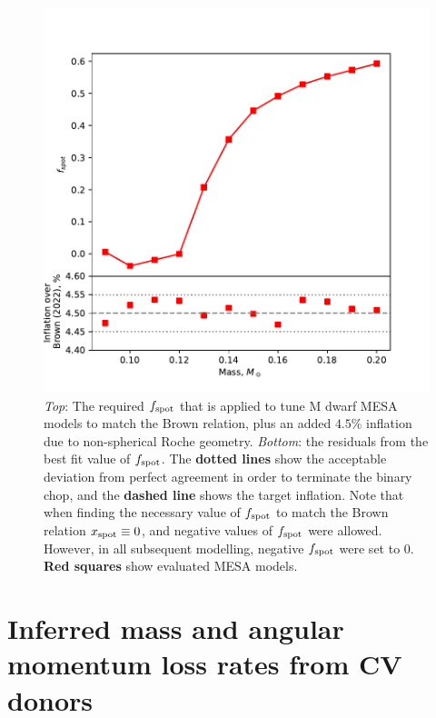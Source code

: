 \begin{figure}
    \centering
    \includegraphics[width=\textwidth]{figures/modelling/fspot_relation_to_match_brown_plus_4.5.pdf}
    \caption{{\it Top}: The required $f_{\rm spot}$ that is applied to tune M dwarf MESA models to match the Brown relation, plus an added $4.5\%$ inflation due to non-spherical Roche geometry. {\it Bottom}: the residuals from the best fit value of $f_{\rm spot}$. The {\bf dotted lines} show the acceptable deviation from perfect agreement in order to terminate the binary chop, and the {\bf dashed line} shows the target inflation. Note that when finding the necessary value of $f_{\rm spot}$ to match the Brown relation $x_{\rm spot} \equiv 0$, and negative values of $f_{\rm spot}$ were allowed. However, in all subsequent modelling, negative $f_{\rm spot}$ were set to 0. {\bf Red squares} show evaluated MESA models.}
    \label{fig:modelling:fspot mass relationship}
\end{figure}



\section{Inferred mass and angular momentum loss rates from CV donors}
\label{sect:modelling:donor mass loss rates}

